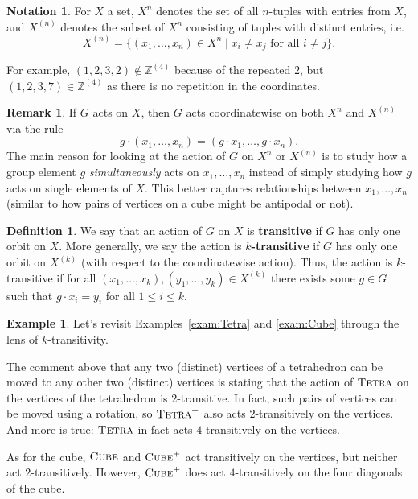 \documentclass[11pt]{amsart}
\theoremstyle{plain}
\theoremstyle{definition}
\newtheorem*{definition*}{Definition}
\newtheorem{example}{Example}
\newtheorem*{remark*}{Remark}
\newtheorem*{notation}{Notation}
\theoremstyle{remark}
\newcommand{\symtetra}{\textsc{Tetra}}
\newcommand{\rsymtetra}{\textsc{Tetra}^+}
\newcommand{\symcube}{\textsc{Cube}}
\newcommand{\rsymcube}{\textsc{Cube}^+}
\begin{document}
\begin{notation}
For $X$ a set, $X^n$ denotes the set of all $n$-tuples with entries from $X$, and $X^{(n)}$ denotes the subset of $X^n$ consisting of tuples with distinct entries, i.e. \[X^{(n)} = \{(x_1,\ldots,x_n) \in X^n \mid \text{$x_i \neq x_j$ for all $i\neq j$}\}.\]
\end{notation}

For example, $(1,2,3,2)\notin \mathbb{Z}^{(4)}$ because of the repeated $2$, but $(1,2,3,7)\in \mathbb{Z}^{(4)}$ as there is no repetition in the coordinates. 

\begin{remark*}
If $G$ acts on $X$, then $G$ acts coordinatewise on both $X^{n}$ and $X^{(n)}$ via the rule \[g\cdot(x_1,\ldots,x_n) = (g\cdot x_1,\ldots,g\cdot x_n).\] 
The main reason for looking at the action of $G$ on $X^{n}$ or $X^{(n)}$ is to study how a group element $g$ \emph{simultaneously} acts on $x_1,\ldots,x_n$ instead of simply studying how $g$ acts on single elements of $X$. This better captures relationships between $x_1,\ldots,x_n$ (similar to how pairs of vertices on a cube might be antipodal or not). 
\end{remark*}

\begin{definition*}
We say that an action of $G$ on $X$ is \textbf{transitive} if $G$ has only one orbit on $X$. More generally, we say the action is \textbf{$k$-transitive} if $G$ has only one orbit on $X^{(k)}$ (with respect to the coordinatewise action). Thus, the action is $k$-transitive if for all $(x_1,\ldots,x_k),(y_1,\ldots,y_k)\in X^{(k)}$ there exists some $g\in G$ such that $g\cdot x_i = y_i$ for all $1\le i\le k$.
\end{definition*}

\begin{example}
Let's revisit Examples~\ref{exam:Tetra} and \ref{exam:Cube} through the lens of $k$-transitivity. 

The comment above that any two  (distinct) vertices of a tetrahedron can be moved to any other two (distinct) vertices is stating that the action of $\symtetra$ on the vertices of  the tetrahedron is $2$-transitive. In fact, such pairs of vertices can be moved using a rotation, so $\rsymtetra$ also acts $2$-transitively on the vertices. And more is true: $\symtetra$ in fact acts $4$-transitively on the vertices. 

As for the cube, $\symcube$ and $\rsymcube$ act transitively on the vertices, but neither act $2$-transitively. However, $\rsymcube$ does act $4$-transitively on the four diagonals of the cube. 
\end{example}
\end{document}
